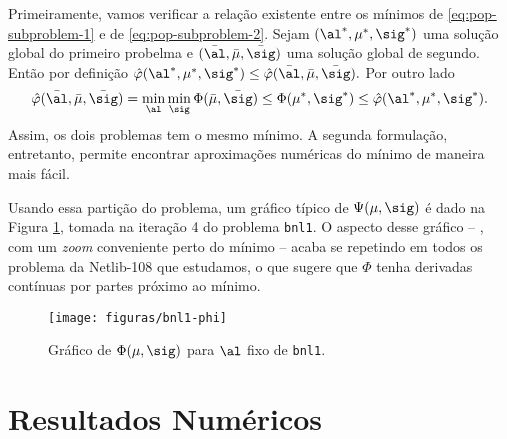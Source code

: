 Primeiramente, vamos verificar a relação existente entre os mínimos de \eqref{eq:pop-subproblem-1} e de \eqref{eq:pop-subproblem-2}. Sejam $(\al^*,\mu^*,\sig^*)$ uma solução global do  primeiro probelma e $(\bar{\al}, \bar{\mu},\bar{\sig})$ uma solução global de segundo. Então por definição
$ \nextphi(\al^*,\mu^*,\sig^*) \leq \nextphi (\bar{\al},\bar{\mu},\bar{\sig}).$
Por outro lado 
\[
\nextphi(\baral,\barmu,\barsig) = \min_{\al}\min_{\sig}\Phi(\barmu,\barsig) \leq \Phi(\mu^{*},\sig^{*}) \leq \nextphi(\al^*,\mu^*,\sig^*).
\]
Assim, os dois problemas tem o mesmo mínimo. A segunda formulação, entretanto, permite encontrar aproximações numéricas do mínimo de maneira mais fácil. 

Usando essa partição do problema, um gráfico típico de $\Psi(\mu,\sig)$ é dado na Figura \ref{fig:bnl1-Phi}, tomada na iteração \num{4} do problema \texttt{bnl1}. O aspecto desse gráfico -- , com um \emph{zoom} conveniente perto do mínimo --  acaba se repetindo  em todos os problema da Netlib-108 que estudamos, o que sugere que $\Phi$ tenha derivadas contínuas por partes próximo ao mínimo.

\begin{figure}[htbp]
\centering
\texttt{[image: figuras/bnl1-phi]}
  	\caption{\label{fig:bnl1-Phi} Gráfico de $\Phi(\mu,\sig)$ para $\al$ fixo de \texttt{bnl1}.}
  \end{figure}




\section{Resultados Numéricos}

